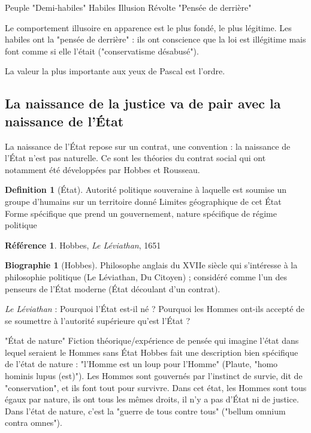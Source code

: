 \documentclass[french]{book}
\theoremstyle{definition}
\newtheorem*{dfn}{Definition}
\newtheorem*{refe}{Référence}
\newtheorem*{bio}{Biographie}
\begin{document}
Peuple
"Demi-habiles"
Habiles
Illusion
Révolte
"Pensée de derrière"

Le comportement illusoire en apparence est le plus fondé, le plus légitime. Les habiles ont la "pensée de derrière" : ils ont conscience que la loi est illégitime mais font comme si elle l'était ("conservatisme désabusé").

La valeur la plus importante aux yeux de Pascal est l'ordre.

\subsection{La naissance de la justice va de pair avec la naissance de l’État}

La naissance de l'État repose sur un contrat, une convention : la naissance de l'État n'est pas naturelle. Ce sont les théories du contrat social qui ont notamment été développées par Hobbes et Rousseau.

\begin{dfn}[État]
Autorité politique souveraine à laquelle est soumise un groupe d'humains sur un territoire donné
Limites géographique de cet État
Forme spécifique que prend un gouvernement, nature spécifique de régime politique
\end{dfn}

\begin{refe}
	Hobbes, \textit{Le Léviathan}, 1651
\end{refe}

\begin{bio}[Hobbes]
	Philosophe anglais du XVIIe siècle qui s'intéresse à la philosophie politique (Le Léviathan, Du Citoyen) ; considéré comme l'un des penseurs de l'État moderne (État découlant d'un contrat).
\end{bio}

\textit{Le Léviathan} : Pourquoi l'État est-il né ? Pourquoi les Hommes ont-ils accepté de se soumettre à l'autorité supérieure qu'est l'État ?

"État de nature"
Fiction théorique/expérience de pensée qui imagine l'état dans lequel seraient le Hommes sans État
Hobbes fait une description bien spécifique de l'état de nature : "l'Homme est un loup pour l'Homme" (Plaute, "homo hominis lupus (est)"). Les Hommes sont gouvernés par l'instinct de survie, dit de "conservation", et ils font tout pour survivre. Dans cet état, les Hommes sont tous égaux par nature, ils ont tous les mêmes droits, il n'y a pas d'État ni de justice. Dans l'état de nature, c'est la "guerre de tous contre tous" ("bellum omnium contra omnes").
\end{document}
